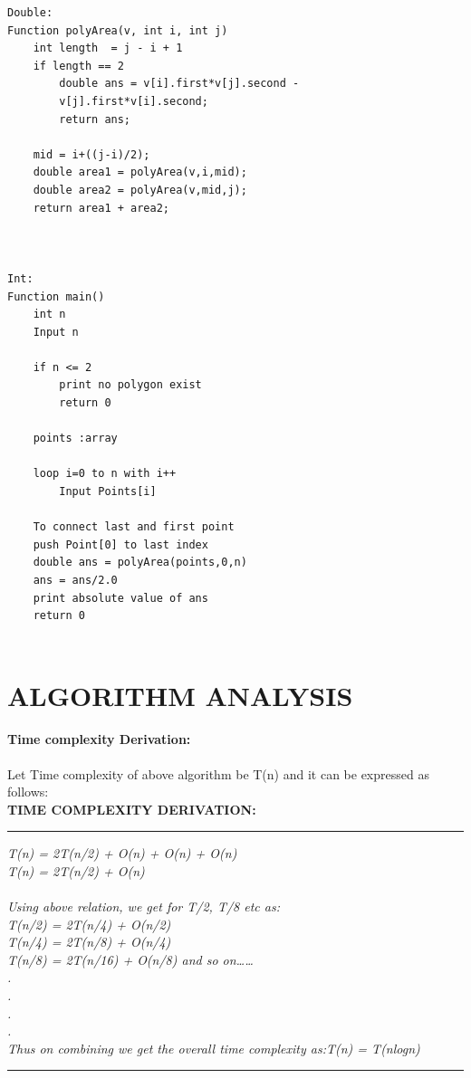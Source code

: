 \documentclass[10pt]{article}
\begin{document}
\begin{multicols*}{2}
\begin{lstlisting}
Double:
Function polyArea(v, int i, int j)
    int length  = j - i + 1
    if length == 2
        double ans = v[i].first*v[j].second - 
        v[j].first*v[i].second;
        return ans;
    
    mid = i+((j-i)/2);
    double area1 = polyArea(v,i,mid);
    double area2 = polyArea(v,mid,j);
    return area1 + area2;

        

Int:
Function main()
    int n
    Input n
    
    if n <= 2
        print no polygon exist
        return 0
    
    points :array
    
    loop i=0 to n with i++
        Input Points[i]
    
    To connect last and first point
    push Point[0] to last index
    double ans = polyArea(points,0,n)
    ans = ans/2.0
    print absolute value of ans
    return 0


\end{lstlisting}
    

	
\section*{ALGORITHM ANALYSIS} 

\paragraph{Time complexity Derivation:} Let Time complexity of above algorithm be T(n) and it can be expressed as follows:\\

\textbf{TIME COMPLEXITY DERIVATION:}
\rule{9cm}{1pt}
\textit{
T(n) = 2T(n/2) + O(n) + O(n) + O(n)\\
T(n) = 2T(n/2) + O(n)\\\\
Using above relation, we get for T/2, T/8 etc as:\\
T(n/2) = 2T(n/4) + O(n/2)\\
T(n/4) = 2T(n/8) + O(n/4)\\
T(n/8) = 2T(n/16) + O(n/8) and so on……\\
.\\
.\\
.\\
.\\
Thus on combining we get the overall time 
complexity as:T(n) = T(nlogn)\\}
\rule{9cm}{1pt}


\end{multicols*}
\end{document}
